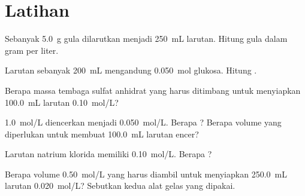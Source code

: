 \section{Latihan}

\begin{exercise}[$\star$]\label{exo:g10:concentration-and-dilution:1}
Sebanyak \qty{5.0}{g} gula dilarutkan menjadi \qty{250}{mL} larutan.
Hitung  gula dalam gram per liter.
\end{exercise}

\begin{exercise}[$\star$]\label{exo:g10:concentration-and-dilution:2}
Larutan sebanyak \qty{200}{mL} mengandung \qty{0.050}{mol} glukosa.
Hitung .
\end{exercise}

\begin{exercise}[$\star$]\label{exo:g10:concentration-and-dilution:3}
Berapa massa tembaga sulfat anhidrat  yang harus ditimbang
untuk menyiapkan \qty{100.0}{mL} larutan \qty{0.10}{mol/L}?
\end{exercise}

\begin{exercise}[$\star$]\label{exo:g10:concentration-and-dilution:4}
 \qty{1.0}{mol/L} diencerkan menjadi \qty{0.050}{mol/L}.
Berapa ? Berapa volume  yang
diperlukan untuk membuat \qty{100.0}{mL} larutan encer?
\end{exercise}

\begin{exercise}[$\star$]\label{exo:g10:concentration-and-dilution:5}
Larutan natrium klorida memiliki  \qty{0.10}{mol/L}.
Berapa ?
\end{exercise}

\begin{exercise}[$\star\star$]\label{exo:g10:concentration-and-dilution:6}
Berapa volume  \qty{0.50}{mol/L} yang harus diambil untuk
menyiapkan \qty{250.0}{mL} larutan \qty{0.020}{mol/L}? Sebutkan kedua
alat gelas yang dipakai.
\end{exercise}

